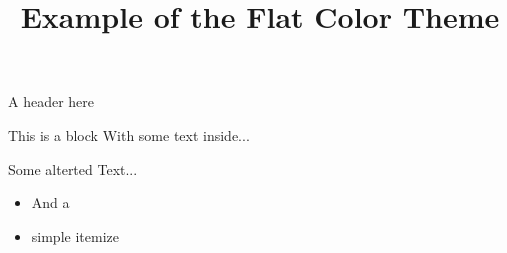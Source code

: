 \documentclass[12pt,a4paper]{beamer}
\title{Example of the Flat Color Theme}
\begin{document}
	\begin{frame}{}
		\maketitle
	\end{frame}
	\begin{frame}{A header here}
		\begin{block}{This is a block}
			With some text inside...
		\end{block}
		\alert{Some alterted Text...}
		\begin{itemize}
			\item And a
			\item simple itemize
		\end{itemize}
	\end{frame}
\end{document}
